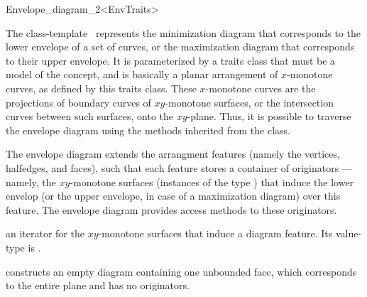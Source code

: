 
\ccRefPageBegin

\begin{ccRefClass}{Envelope_diagram_2<EnvTraits>}

\ccDefinition

The class-template \ccClassTemplateName\ represents the minimization
diagram that corresponds to the lower envelope of a set of curves, or the
maximization diagram that corresponds to their upper envelope. It is
parameterized by a traits class that must be a model of the
 concept, and is basically a planar arrangement of
$x$-monotone curves, as defined by this traits class. These $x$-monotone
curves are the projections of boundary curves of $xy$-monotone surfaces,
or the intersection curves between such surfaces, onto the $xy$-plane.
Thus, it is possible to traverse the envelope diagram using the
methods inherited from the  class.

The envelope diagram extends the arrangment features (namely the vertices,
halfedges, and faces), such that each feature stores a container of
originators --- namely, the $xy$-monotone surfaces (instances of the type
) that induce the lower envelop
(or the upper envelope, in case of a maximization diagram) over this
feature. The envelope diagram provides access methods to these originators.

 
\ccInheritsFrom

\ccTypes

\ccGlue
{}

{an iterator for the $xy$-monotone surfaces that induce a diagram feature.
 Its value-type is .}

\ccCreation
{}

    {constructs an empty diagram containing one unbounded face,
     which corresponds to the entire plane and has no originators.}
    

\end{ccRefClass}
